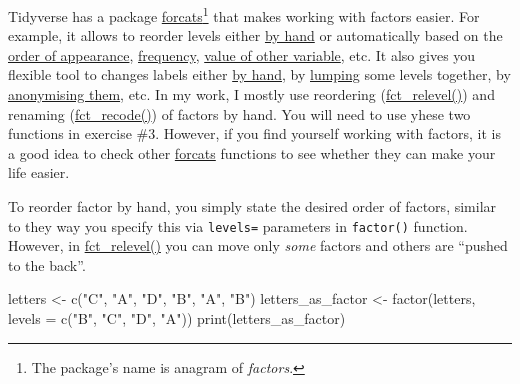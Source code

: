 \documentclass[
]{book}
\newenvironment{Shaded}{\begin{snugshade}}{\end{snugshade}}
\newcommand{\AttributeTok}[1]{\textcolor[rgb]{0.77,0.63,0.00}{#1}}
\newcommand{\FunctionTok}[1]{\textcolor[rgb]{0.00,0.00,0.00}{#1}}
\newcommand{\NormalTok}[1]{#1}
\newcommand{\OtherTok}[1]{\textcolor[rgb]{0.56,0.35,0.01}{#1}}
\newcommand{\StringTok}[1]{\textcolor[rgb]{0.31,0.60,0.02}{#1}}
\begin{document}
Tidyverse has a package \href{https://forcats.tidyverse.org/}{forcats}\footnote{The package's name is anagram of \emph{factors}.} that makes working with factors easier. For example, it allows to reorder levels either \href{https://forcats.tidyverse.org/reference/fct_relevel.html}{by hand} or automatically based on the \href{https://forcats.tidyverse.org/reference/fct_inorder.html}{order of appearance}, \href{https://forcats.tidyverse.org/reference/fct_inorder.html}{frequency}, \href{https://forcats.tidyverse.org/reference/fct_reorder.html}{value of other variable}, etc. It also gives you flexible tool to changes labels either \href{https://forcats.tidyverse.org/reference/fct_recode.html}{by hand}, by \href{https://forcats.tidyverse.org/reference/fct_lump.html}{lumping} some levels together, by \href{https://forcats.tidyverse.org/reference/fct_anon.html}{anonymising them}, etc. In my work, I mostly use reordering (\href{https://forcats.tidyverse.org/reference/fct_relevel.html}{fct\_relevel()}) and renaming (\href{https://forcats.tidyverse.org/reference/fct_recode.html}{fct\_recode()}) of factors by hand. You will need to use yhese two functions in exercise \#3. However, if you find yourself working with factors, it is a good idea to check other \href{https://forcats.tidyverse.org/}{forcats} functions to see whether they can make your life easier.

To reorder factor by hand, you simply state the desired order of factors, similar to they way you specify this via \texttt{levels=} parameters in \texttt{factor()} function. However, in \href{https://forcats.tidyverse.org/reference/fct_relevel.html}{fct\_relevel()} you can move only \emph{some} factors and others are ``pushed to the back''.

\begin{Shaded}
\begin{Highlighting}[]
\NormalTok{letters }\OtherTok{\textless{}{-}} \FunctionTok{c}\NormalTok{(}\StringTok{"C"}\NormalTok{, }\StringTok{"A"}\NormalTok{, }\StringTok{"D"}\NormalTok{, }\StringTok{"B"}\NormalTok{, }\StringTok{"A"}\NormalTok{, }\StringTok{"B"}\NormalTok{)}
\NormalTok{letters\_as\_factor }\OtherTok{\textless{}{-}} \FunctionTok{factor}\NormalTok{(letters, }\AttributeTok{levels =} \FunctionTok{c}\NormalTok{(}\StringTok{"B"}\NormalTok{, }\StringTok{"C"}\NormalTok{, }\StringTok{"D"}\NormalTok{, }\StringTok{"A"}\NormalTok{))}
\FunctionTok{print}\NormalTok{(letters\_as\_factor)}
\end{Highlighting}
\end{Shaded}
\end{document}

